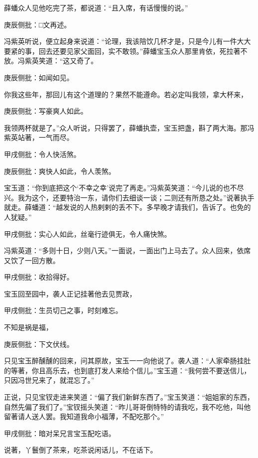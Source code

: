 \begin{parag}


    薛蟠众人见他吃完了茶，都说道：“且入席，有话慢慢的说。”\begin{note}庚辰侧批：□文再述。\end{note}冯紫英听说，便立起身来说道：“论理，我该陪饮几杯才是，只是今儿有一件大大要紧的事，回去还要见家父面回，实不敢领。”薛蟠宝玉众人那里肯依，死拉著不放。冯紫英笑道：“这又奇了。\begin{note}庚辰侧批：如闻如见。\end{note}你我这些年，那回儿有这个道理的？果然不能遵命。若必定叫我领，拿大杯来，\begin{note}庚辰侧批：写豪爽人如此。\end{note}我领两杯就是了。”众人听说，只得罢了，薛蟠执壶，宝玉把盏，斟了两大海。那冯紫英站著，一气而尽。\begin{note}甲戌侧批：令人快活煞。\end{note}\begin{note}庚辰侧批：爽快人如此，令人羡煞。\end{note}宝玉道：“你到底把这个‘不幸之幸’说完了再走。”冯紫英笑道：“今儿说的也不尽兴。我为这个，还要特治一东，请你们去细谈一谈；二则还有所恳之处。”说著执手就走。薛蟠道：“越发说的人热剌剌的丢不下。多早晚才请我们，告诉了。也免的人犹疑。”\begin{note}甲戌侧批：实心人如此，丝毫行迹俱无，令人痛快煞。\end{note}冯紫英道：“多则十日，少则八天。”一面说，一面出门上马去了。众人回来，依席又饮了一回方散。\begin{note}甲戌侧批：收拾得好。\end{note}
\end{parag}


\begin{parag}


    宝玉回至园中，袭人正记挂著他去见贾政，\begin{note}甲戌侧批：生员切己之事，时刻难忘。\end{note}不知是祸是福，\begin{note}庚辰侧批：下文伏线。\end{note}只见宝玉醉醺醺的回来，问其原故，宝玉一一向他说了。袭人道：“人家牵肠挂肚的等著，你且高乐去，也到底打发人来给个信儿。”宝玉道：“我何尝不要送信儿，只因冯世兄来了，就混忘了。”
\end{parag}


\begin{parag}


    正说，只见宝钗走进来笑道：“偏了我们新鲜东西了。”宝玉笑道：“姐姐家的东西，自然先偏了我们了。”宝钗摇头笑道：“昨儿哥哥倒特特的请我吃，我不吃他，叫他留著请人送人罢。我知道我命小福薄，不配吃那个。”\begin{note}甲戌侧批：暗对呆兄言宝玉配吃语。\end{note}说著，丫鬟倒了茶来，吃茶说闲话儿，不在话下。
\end{parag}


